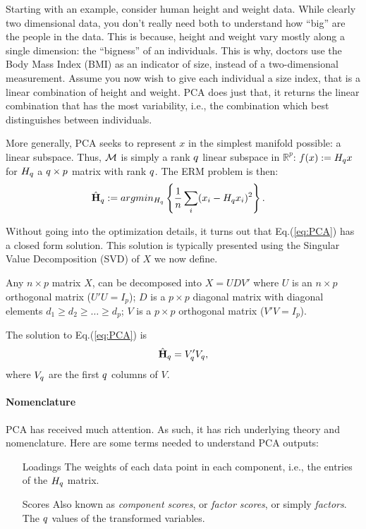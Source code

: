 Starting with an example, consider human height and weight data. 
While clearly two dimensional data, you don't really need both to understand how ``big'' are the people in the data. 
This is because, height and weight vary mostly along a single dimension: the ``bigness'' of an individuals. 
This is why, doctors use the Body Mass Index (BMI) as an indicator of size, instead of a two-dimensional measurement.
Assume you now wish to give each individual a size index, that is a linear combination of height and weight. PCA does just that, it returns the linear combination that has the most variability, i.e., the combination which best distinguishes between individuals. 

More generally, PCA seeks to represent $x$ in the simplest manifold possible: a linear subspace. Thus, $\mathcal{M}$ is simply a rank $q$ linear subspace in $\mathbb{R}^p$: $f(x):=H_q x$ for $H_q$ a $q \times p$ matrix with rank $q$.
The ERM problem is then:
\begin{align}
\label{eq:PCA}
	& \hat{\mathbf{H}}_q:= argmin_{H_q}\left\{ \frac{1}{n}\sum_i (x_i-H_q x_i)^2 \right\} .
\end{align}

Without going into the optimization details, it turns out that Eq.(\ref{eq:PCA}) has a closed form solution. 
This solution is typically presented using the Singular Value Decomposition (SVD) of $X$ we now define.
\begin{definition}[SVD]
Any $n \times p$ matrix $X$, can be decomposed into $X=UDV'$ where 
$U$ is an $n \times p$ orthogonal matrix ($U'U=I_p$); 
$D$ is a $p \times p$ diagonal matrix with diagonal elements $d_1 \geq d_2 \geq \dots \geq d_p$;
$V$ is a $p \times p$ orthogonal matrix ($V'V=I_p$).
\end{definition}

The solution to Eq.(\ref{eq:PCA}) is 
\begin{align}
\label{eq:PCA_solution}
	\hat{\mathbf{H}}_q=V_q'V_q,
\end{align}
where $V_q$ are the first $q$ columns of $V$.


\paragraph{Nomenclature}
PCA has received much attention. As such, it has rich underlying theory and nomenclature.
Here are some terms needed to understand PCA outputs:
\begin{itemize}
\item[Loadings] The weights of each data point in each component, i.e., the entries of the $H_q$ matrix.
\item[Scores] Also known as \emph{component scores}, or \emph{factor scores}, or simply \emph{factors}. The $q$ values of the transformed variables.
\end{itemize}


